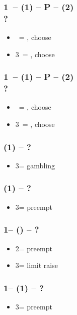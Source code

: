 \documentclass[12pt, a4paper]{article}
\begin{document}
\subsubsection*{1\diams\ -- (1\spades) -- P -- (2\spades) \\ ?}
\begin{itemize}
    \item \dbl\ = \twosuit{\diams}{\hearts}, choose
    \item 3\clubs\ = \twosuit{\clubs}{\diams}, choose
\end{itemize}

\subsubsection*{1\diams\ -- (1\hearts) -- P -- (2\hearts) \\ ?}
\begin{itemize}
    \item \dbl\ = \twosuit{\diams}{\spades}, choose
    \item 3\clubs\ = \twosuit{\clubs}{\diams}, choose
\end{itemize}

\subsubsection*{(1\diams) -- ?}
\begin{itemize}
    \item 3\diams = gambling \clubs
\end{itemize}

\subsubsection*{(1\clubs) -- ?}
\begin{itemize}
    \item 3\clubs = \clubs preempt
\end{itemize}

\subsubsection*{1\clubs -- (\dbl) -- ?}
\begin{itemize}
    \item 2\nt = preempt \clubs
    \item 3\clubs = limit raise
\end{itemize}

\subsubsection*{1\clubs -- (1) -- ?}
\begin{itemize}
    \item 3\clubs = preempt
\end{itemize}
\end{document}
